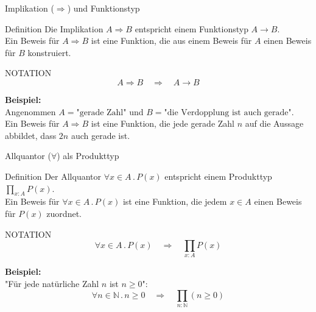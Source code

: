 \documentclass{beamer}
\begin{document}
\begin{frame}{Implikation (\(\Rightarrow\)) und Funktionstyp}
    \begin{block}{Definition}
        Die Implikation \( A \Rightarrow B \) entspricht einem Funktionstyp \( A \to B \). \\
        Ein Beweis für \( A \Rightarrow B \) ist eine Funktion, die aus einem Beweis für \( A \) einen Beweis für \( B \) konstruiert.
    \end{block}

    \begin{block}{NOTATION}
        \[
        A \Rightarrow B \quad \Rightarrow \quad A \to B
        \]
    \end{block}

    \textbf{Beispiel:} \\
    Angenommen \( A = \text{"gerade Zahl"} \) und \( B = \text{"die Verdopplung ist auch gerade"} \). \\
    Ein Beweis für \( A \Rightarrow B \) ist eine Funktion, die jede gerade Zahl \( n \) auf die Aussage abbildet, dass \( 2n \) auch gerade ist.
\end{frame}

\begin{frame}{Allquantor (\(\forall\)) als Produkttyp}
    \begin{block}{Definition}
        Der Allquantor \( \forall x \in A \, . \, P(x) \) entspricht einem Produkttyp \( \prod_{x : A} P(x) \). \\
        Ein Beweis für \( \forall x \in A \, . \, P(x) \) ist eine Funktion, die jedem \( x \in A \) einen Beweis für \( P(x) \) zuordnet.
    \end{block}

    \begin{block}{NOTATION}
        \[
        \forall x \in A \, . \, P(x) \quad \Rightarrow \quad \prod_{x : A} P(x)
        \]
    \end{block}

    \textbf{Beispiel:} \\
    "Für jede natürliche Zahl \( n \) ist \( n \geq 0 \)":
    \[
    \forall n \in \mathbb{N} \, . \, n \geq 0 \quad \Rightarrow \quad \prod_{n : \mathbb{N}} (n \geq 0)
    \]
\end{frame}
\end{document}
